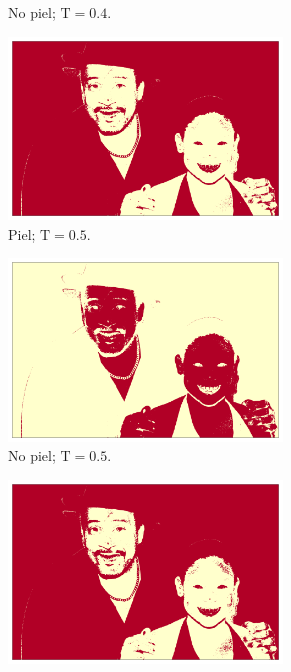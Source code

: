 \begin{figure}[ht!]
\begin{subfigure}{0.4\textwidth}
        \caption{No piel; $\text{T} = 0.4$.}
    \end{subfigure}
    \begin{subfigure}{0.4\textwidth}
        \centering
        \includegraphics[width=0.8\textwidth]{../figures/image3/image_03_treshskin_50percent.png}
        \caption{Piel; $\text{T} = 0.5$.}
    \end{subfigure}
    \hspace{1cm}
    \begin{subfigure}{0.4\textwidth}
        \centering
        \includegraphics[width=0.8\textwidth]{../figures/image3/image_03_treshbg_50percent.png}
        \caption{No piel; $\text{T} = 0.5$.}
    \end{subfigure}
    \begin{subfigure}{0.4\textwidth}
        \centering
        \includegraphics[width=0.8\textwidth]{../figures/image3/image_03_treshskin_60percent.png}

\end{subfigure}
\end{figure}
